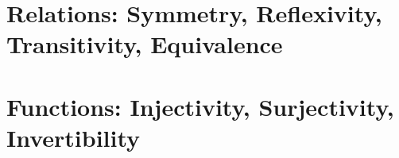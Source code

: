 \section{Relations: Symmetry, Reflexivity, Transitivity, Equivalence}
\label{sec:Relations}

\section{Functions: Injectivity, Surjectivity, Invertibility}
\label{sec:Functions}

